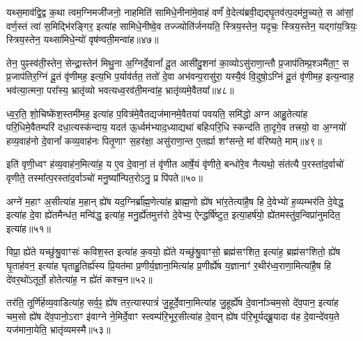यथ्स॒माव॑द्वि॒द्व क॒था त्वम॒ग्निमजी॑जनो॒ नाहमिति॑ सामिधे॒नीना॑मे॒वाहं वर्णं॑ वे॒देत्य॑ब्रवी॒द्यद्घृ॒तव॑त्प॒दम॑नू॒च्यते॒ स आ॑सां॒ वर्ण॒स्तं त्वा॑ स॒मिद्भि॑रङ्गिर॒ इत्या॑ह सामिधे॒नीष्वे॒व तज्ज्योति॑र्जनयति॒ स्त्रिय॒स्तेन॒ यदृचः॒ स्त्रिय॒स्तेन॒ यद्गा॑य॒त्रियः॒ स्त्रिय॒स्तेन॒ यथ्सा॑मिधे॒न्यो॑ वृष॑ण्वती॒मन्वा॑ह॥४७॥

तेन॒ पुꣴस्व॑ती॒स्तेन॒ सेन्द्रा॒स्तेन॑ मिथु॒ना अ॒ग्निर्दे॒वानां᳚ दू॒त आसी॑दु॒शना॑ का॒व्यो\-ऽसु॑राणा॒न्तौ प्र॒जाप॑तिम्प्र॒श्ञमै॑ता॒ꣳ॒ स प्र॒जाप॑तिर॒ग्निं दू॒तं वृ॑णीमह॒ इत्य॒भि प॒र्याव॑र्तत॒ ततो॑ दे॒वा अभ॑वन्प॒रासु॑रा॒ यस्यै॒वं वि॒दुषो॒\-ऽग्निं दू॒तं वृ॑णीमह॒ इत्य॒न्वाह॒ भव॑त्या॒त्मना॒ परा᳚स्य॒ भ्रातृ॑व्यो भवत्यध्व॒रव॑ती॒मन्वा॑ह॒ भ्रातृ॑व्यमे॒वैतया᳚॥४८॥

ध्व॒र॒ति॒ शो॒चिष्के॑श॒स्तमी॑मह॒ इत्या॑ह प॒वित्र॑मे॒वैतद्यज॑मानमे॒वैतया॑ पवयति॒ समि॑द्धो अग्न आहु॒तेत्या॑ह परि॒धिमे॒वैतम्परि॑ दधा॒त्यस्क॑न्दाय॒ यदत॑ ऊ॒र्ध्वम॑भ्याद॒ध्याद्यथा॑ बहिःपरि॒धि स्कन्द॑ति ता॒दृगे॒व तत्त्रयो॒ वा अ॒ग्नयो॑ हव्य॒वाह॑नो दे॒वानां᳚ कव्य॒वाह॑नः पितृ॒णाꣳ स॒हर॑क्षा॒ असु॑राणा॒न्त ए॒तर्\mbox{}ह्या शꣳ॑सन्ते॒ मां व॑रिष्यते॒ माम्॥४९॥

इति॑ वृणी॒ध्वꣳ ह॑व्य॒वाह॑न॒मित्या॑ह॒ य ए॒व दे॒वानां॒ तं वृ॑णीत आर्\mbox{}षे॒यं वृ॑णीते॒ बन्धो॑रे॒व नैत्यथो॒ संत॑त्यै प॒रस्ता॑द॒र्वाचो॑ वृणीते॒ तस्मा᳚त्प॒रस्ता॑द॒र्वाञ्चो॑ मनु॒ष्या᳚न्पित॒रो\-ऽनु॒ प्र पि॑पते॥५०॥

{\anuvakamend[{अशा᳚न्तावाह॒ पञ्च॑दशाब्रवी॒दन्वा॑है॒तया॑ वरिष्यते॒ मामेका॒न्नत्रि॒ꣳ॒शच्च॑॥८॥}]}

अग्ने॑ म॒हाꣳ अ॒सीत्या॑ह म॒हान् ह्ये॑ष यद॒ग्निर्ब्रा᳚ह्म॒णेत्या॑ह ब्राह्म॒णो ह्ये॑ष भा॑र॒तेत्या॑है॒ष हि दे॒वेभ्यो॑ ह॒व्यम्भर॑ति दे॒वेद्ध॒ इत्या॑ह दे॒वा ह्ये॑तमैन्ध॑त॒ मन्वि॑द्ध॒ इत्या॑ह॒ मनु॒र्\mbox{}ह्ये॑तमुत्त॑रो दे॒वेभ्य॒ ऐन्द्धर्\mbox{}षि॑ष्टुत॒ इत्या॒हर्\mbox{}ष॑यो॒ ह्ये॑तमस्तु॑व॒न्विप्रा॑नुमदित॒ इत्या॑ह॥५१॥

विप्रा॒ ह्ये॑ते यच्छु॑श्रु॒वाꣳसः॑ कविश॒स्त इत्या॑ह क॒वयो॒ ह्ये॑ते यच्छु॑श्रु॒वाꣳसो॒ ब्रह्म॑सꣳशित॒ इत्या॑ह॒ ब्रह्म॑सꣳशितो॒ ह्ये॑ष घृ॒ताह॑वन॒ इत्या॑ह घृताहु॒तिर्\mbox{}ह्य॑स्य प्रि॒यत॑मा प्र॒णीर्य॒ज्ञाना॒मित्या॑ह प्र॒णीर्\mbox{}ह्ये॑ष य॒ज्ञानाꣳ॑ र॒थीर॑ध्व॒राणा॒मित्या॑है॒ष हि दे॑वर॒थो॑\-ऽतूर्तो॒ होतेत्या॑ह॒ न ह्ये॑तं कश्च॒न॥५२॥

तर॑ति॒ तूर्णि॑र्\mbox{}हव्य॒वाडित्या॑ह॒ सर्व॒ꣴ॒ ह्ये॑ष तर॒त्यास्पात्रं॑ जु॒हूर्दे॒वाना॒मित्या॑ह जु॒हूर्\mbox{}ह्ये॑ष दे॒वाना᳚ञ्चम॒सो दे॑व॒पान॒ इत्या॑ह चम॒सो ह्ये॑ष दे॑व॒पानो॒\-ऽराꣳ इ॑वाग्ने ने॒मिर्दे॒वाꣳ स्त्वम्प॑रि॒भूर॒सीत्या॑ह दे॒वान् ह्ये॑ष प॑रि॒भूर्यद्ब्रू॒यादा व॑ह दे॒वान्दे॑वय॒ते यज॑माना॒येति॒ भ्रातृ॑व्यमस्मै॥५३॥


